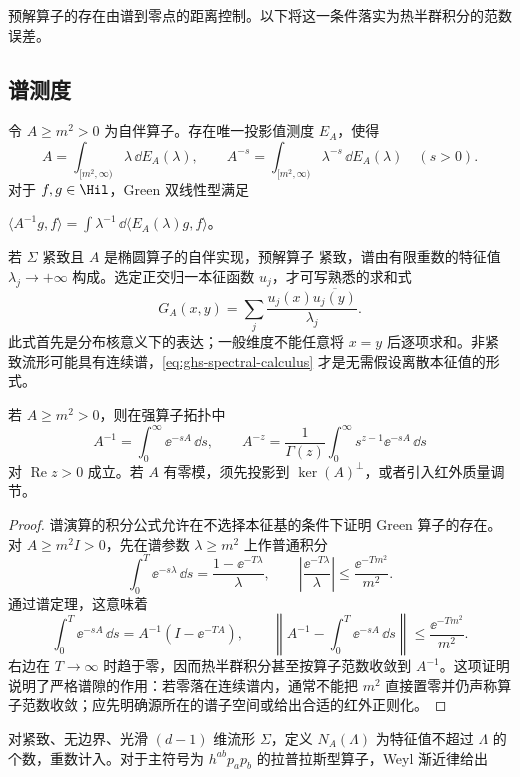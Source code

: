 
预解算子的存在由谱到零点的距离控制。以下将这一条件落实为热半群积分的范数误差。

\subsection{谱测度}
\label{sec:ghs-spectral-measure}

\begin{theorem}
\label{thm:ghs-spectral-measure}
令 $A\geq m^2>0$ 为自伴算子。存在唯一投影值测度 $E_A$，使得
\begin{equation}\label{eq:ghs-spectral-calculus}
 A=\int_{[m^2,\infty)}\lambda\,\dd E_A(\lambda),\qquad
 A^{-s}=\int_{[m^2,\infty)}\lambda^{-s}\,\dd E_A(\lambda)\quad(s>0).
\end{equation}
对于 $f,g\in\Hil$，Green 双线性型满足

$\langle A^{-1}g, f\rangle=\int\lambda^{-1}\,\dd\langle E_A(\lambda)g, f\rangle$。
\end{theorem}

若 $\Sigma$ 紧致且 $A$ 是椭圆算子的自伴实现，预解算子 紧致，谱由有限重数的特征值 $\lambda_j\to+\infty$ 构成。选定正交归一本征函数 $u_j$，才可写熟悉的求和式
\begin{equation}\label{eq:ghs-green-spectral-sum}
 G_A(x,y)=\sum_j\frac{u_j(x)\overline{u_j(y)}}{\lambda_j}.
\end{equation}
此式首先是分布核意义下的表达；一般维度不能任意将 $x=y$ 后逐项求和。非紧致流形可能具有连续谱，\cref{eq:ghs-spectral-calculus} 才是无需假设离散本征值的形式。

\begin{proposition}
若 $A\geq m^2>0$，则在强算子拓扑中
\begin{equation}\label{eq:ghs-heat-green-laplace}
 A^{-1}=\int_0^\infty\ee^{-sA}\,\dd s,
 \qquad A^{-z}=\frac1{\Gamma(z)}\int_0^\infty s^{z-1}\ee^{-sA}\,\dd s
\end{equation}
对 $\operatorname{Re}z>0$ 成立。若 $A$ 有零模，须先投影到 $\ker(A)^\perp$，或者引入红外质量调节。
\end{proposition}
\begin{proof}
谱演算的积分公式允许在不选择本征基的条件下证明 Green 算子的存在。对 $A\ge m^2I>0$，先在谱参数 $\lambda\ge m^2$ 上作普通积分
\[
 \int_0^T\ee^{-s\lambda}\,\dd s=\frac{1-\ee^{-T\lambda}}{\lambda},
 \qquad
 \left|\frac{\ee^{-T\lambda}}{\lambda}\right|
 \le\frac{\ee^{-Tm^2}}{m^2}.
\]
通过谱定理，这意味着
\[
 \int_0^T\ee^{-sA}\,\dd s=A^{-1}(I-\ee^{-TA}),\qquad
 \left\|A^{-1}-\int_0^T\ee^{-sA}\,\dd s\right\|
 \le \frac{\ee^{-Tm^2}}{m^2}.
\]
右边在 $T\to\infty$ 时趋于零，因而热半群积分甚至按算子范数收敛到 $A^{-1}$。这项证明说明了严格谱隙的作用：若零落在连续谱内，通常不能把 $m^2$ 直接置零并仍声称算子范数收敛；应先明确源所在的谱子空间或给出合适的红外正则化。
\end{proof}

对紧致、无边界、光滑 $(d-1)$ 维流形 $\Sigma$，定义 $N_A(\Lambda)$ 为特征值不超过 $\Lambda$ 的个数，重数计入。对于主符号为 $h^{ab}p_ap_b$ 的拉普拉斯型算子，Weyl 渐近律给出
